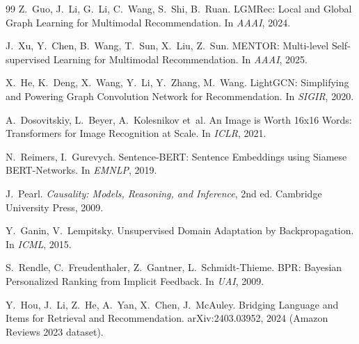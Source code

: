 \documentclass[12pt,a4paper]{article}
\begin{document}
\begin{thebibliography}{99}
Z.~Guo, J.~Li, G.~Li, C.~Wang, S.~Shi, B.~Ruan.
\newblock LGMRec: Local and Global Graph Learning for Multimodal Recommendation.
\newblock In \emph{AAAI}, 2024.

J.~Xu, Y.~Chen, B.~Wang, T.~Sun, X.~Liu, Z.~Sun.
\newblock MENTOR: Multi-level Self-supervised Learning for Multimodal Recommendation.
\newblock In \emph{AAAI}, 2025.

X.~He, K.~Deng, X.~Wang, Y.~Li, Y.~Zhang, M.~Wang.
\newblock LightGCN: Simplifying and Powering Graph Convolution Network for
Recommendation.
\newblock In \emph{SIGIR}, 2020.

A.~Dosovitskiy, L.~Beyer, A.~Kolesnikov et~al.
\newblock An Image is Worth 16x16 Words: Transformers for Image Recognition at Scale.
\newblock In \emph{ICLR}, 2021.

N.~Reimers, I.~Gurevych.
\newblock Sentence-BERT: Sentence Embeddings using Siamese BERT-Networks.
\newblock In \emph{EMNLP}, 2019.

J.~Pearl.
\newblock \emph{Causality: Models, Reasoning, and Inference}, 2nd ed.
\newblock Cambridge University Press, 2009.

Y.~Ganin, V.~Lempitsky.
\newblock Unsupervised Domain Adaptation by Backpropagation.
\newblock In \emph{ICML}, 2015.

S.~Rendle, C.~Freudenthaler, Z.~Gantner, L.~Schmidt-Thieme.
\newblock BPR: Bayesian Personalized Ranking from Implicit Feedback.
\newblock In \emph{UAI}, 2009.

Y.~Hou, J.~Li, Z.~He, A.~Yan, X.~Chen, J.~McAuley.
\newblock Bridging Language and Items for Retrieval and Recommendation.
\newblock arXiv:2403.03952, 2024 (Amazon Reviews 2023 dataset).
\end{thebibliography}
\end{document}

